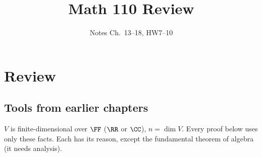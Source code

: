 \documentclass[10pt]{scrartcl}
\title{Math 110 Review}
\subtitle{Notes Ch.~13--18, HW7--10}
\author{}
\date{}
\begin{document}
\maketitle

\section{Review}

\subsection{Tools from earlier chapters}

$V$ is finite-dimensional over $\FF$ ($\RR$ or $\CC$), $n=\dim V$. Every proof below uses only these facts. Each has its reason, except the fundamental theorem of algebra (it needs analysis).
\end{document}
